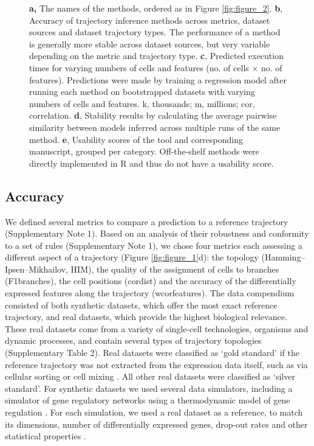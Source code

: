 \begin{figure}
{		\textbf{a,} The names of the methods, ordered as in Figure \ref{fig:figure_2}. \textbf{b}, Accuracy of trajectory inference methods across metrics, dataset sources and dataset trajectory types. The performance of a method is generally more stable across dataset sources, but very variable depending on the metric and trajectory type. \textbf{c}, Predicted execution times for varying numbers of cells and features (no. of cells $\times$ no. of features). Predictions were made by training a regression model after running each method on bootstrapped datasets with varying numbers of cells and features. k, thousands; m, millions; cor, correlation. \textbf{d}, Stability results by calculating the average pairwise similarity between models inferred across multiple runs of the same method. \textbf{e}, Usability scores of the tool and corresponding manuscript, grouped per category. Off-the-shelf methods were directly implemented in R and thus do not have a usability score. 
	}
	\label{fig:figure_3}
\end{figure}

\subsection{Accuracy}

We defined several metrics to compare a prediction to a reference trajectory (Supplementary Note 1). Based on an analysis of their robustness and conformity to a set of rules (Supplementary Note 1), we chose four metrics each assessing a different aspect of a trajectory (Figure \ref{fig:figure_1}d): the topology (Hamming–Ipsen–Mikhailov, HIM), the quality of the assignment of cells to branches (F1branches), the cell positions (cordist) and the accuracy of the differentially expressed features along the trajectory (wcorfeatures). The data compendium consisted of both synthetic datasets, which offer the most exact reference trajectory, and real datasets, which provide the highest biological relevance. These real datasets come from a variety of single-cell technologies, organisms and dynamic processes, and contain several types of trajectory topologies (Supplementary Table 2). Real datasets were classified as ‘gold standard’ if the reference trajectory was not extracted from the expression data itself, such as via cellular sorting or cell mixing \cite{tian_scrnaseqmixologybetter_2018}. All other real datasets were classified as ‘silver standard’. For synthetic datasets we used several data simulators, including a simulator of gene regulatory networks using a thermodynamic model of gene regulation \cite{schaffter_genenetweaversilicobenchmark_2011}. For each simulation, we used a real dataset as a reference, to match its dimensions, number of differentially expressed genes, drop-out rates and other statistical properties \cite{zappia_splattersimulationsinglecell_2017}.

